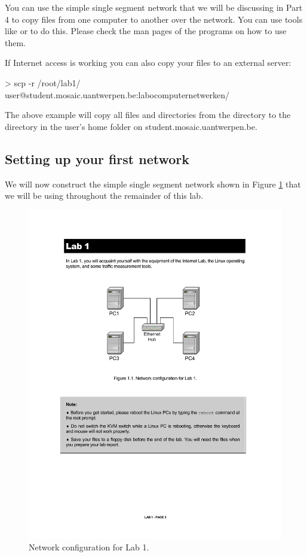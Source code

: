 You can use the simple single segment network that we will be discussing in Part 4 to copy files from one computer to another over the network. You can use tools like  or  to do this. Please check the man pages of the programs on how to use them.

If Internet access is working you can also copy your files to an external server:

\begin{cmdblock}
	> scp -r /root/lab1/ user@student.mosaic.uantwerpen.be:labocomputernetwerken/
\end{cmdblock}

The above example will copy all files and directories from the  directory to the  directory in the user's home folder on student.mosaic.uantwerpen.be.

\newpage
\subsection{Setting up your first network}

We will now construct the simple single segment network shown in Figure \ref{fig:lab1-network} that we will be using throughout the remainder of this lab.

\begin{figure}[ht]
	\centering
	\includegraphics{graphics/lab1-network.pdf}	
	\caption{Network configuration for Lab 1.}
	\label{fig:lab1-network}
\end{figure}

